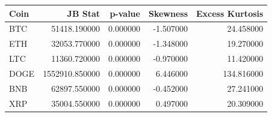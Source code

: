 \begin{tabular}{lrrrr}
\toprule
Coin & JB Stat & p-value & Skewness & Excess Kurtosis \\
\midrule
BTC & 51418.190000 & 0.000000 & -1.507000 & 24.458000 \\
ETH & 32053.770000 & 0.000000 & -1.348000 & 19.270000 \\
LTC & 11360.720000 & 0.000000 & -0.970000 & 11.420000 \\
DOGE & 1552910.850000 & 0.000000 & 6.446000 & 134.816000 \\
BNB & 62897.550000 & 0.000000 & -0.452000 & 27.241000 \\
XRP & 35004.550000 & 0.000000 & 0.497000 & 20.309000 \\
\bottomrule
\end{tabular}
